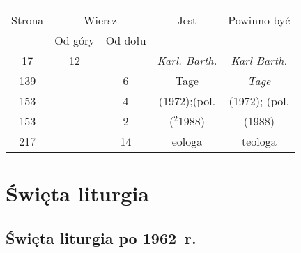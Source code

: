 \documentclass[a4paper,11pt]{article}
\begin{document}
\begin{center}

  \begin{tabular}{|c|c|c|c|c|}
    \hline
    & \multicolumn{2}{c|}{} & & \\
    Strona & \multicolumn{2}{c|}{Wiersz} & Jest
                              & Powinno być \\ \cline{2-3}
    & Od góry & Od dołu & & \\
    \hline
    17  & 12 & & \emph{Karl. Barth.} & \emph{Karl Barth.} \\
    139 & &  6 & Tage & \emph{Tage} \\
    153 & &  4 & (1972);(pol. & (1972); (pol. \\
    153 & &  2 & ($^{ 2 }$1988) & (1988) \\
    217 & & 14 & eologa & teologa \\
    \hline
  \end{tabular}

\end{center}











\newpage
\section{Święta liturgia}

\vspace{\spaceTwo}



\subsection{Święta liturgia po 1962~r.}

\vspace{\spaceThree}



\end{document}
